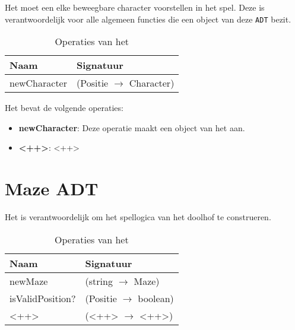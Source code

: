 Het \texttt{} moet een elke beweegbare character voorstellen in het spel.
Deze is verantwoordelijk voor alle algemeen functies die een object van deze \texttt{ADT} bezit.

\begin{table}[hbt]
\centering
\begin{tabular}{|ll|}
\hline
\rowcolor[HTML]{000000} 
{\color[HTML]{FFFFFF} \textbf{Naam}} & {\color[HTML]{FFFFFF} \textbf{Signatuur}} \\ \hline
newCharacter                                 & (Positie $\rightarrow$ Character)                                       \\ \hline
\end{tabular}
\caption{Operaties van het \texttt{}}
\label{table:character}
\end{table}

Het \texttt{} bevat de volgende operaties:

\begin{itemize}
	\item \textbf{newCharacter}: Deze operatie maakt een object van het \texttt{} aan.
	\item \textbf{<++>}: <++>
\end{itemize}

\section{Maze ADT}
\label{section:maze}

Het \texttt{} is verantwoordelijk om het spellogica van het doolhof te construeren.

\begin{table}[hbt]
\centering
\begin{tabular}{|ll|}
\hline
\rowcolor[HTML]{000000} 
{\color[HTML]{FFFFFF} \textbf{Naam}} & {\color[HTML]{FFFFFF} \textbf{Signatuur}} \\ \hline
newMaze                              & (string $\rightarrow$ Maze)               \\ \hline
isValidPosition?                      & (Positie $\rightarrow$ boolean)           \\ \hline
 <++>                                & (<++> $\rightarrow$ <++>)                 \\ \hline
\end{tabular}
\caption{Operaties van het \texttt{}}
\label{table:maze}
\end{table}

